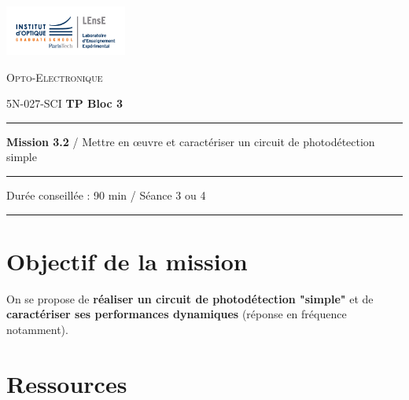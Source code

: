 \newpage
\pagestyle{empty}

\begin{minipage}[c]{.25\linewidth}
	\includegraphics[width=4cm]{images/Logo-LEnsE.png}
\end{minipage} \hfill
\begin{minipage}[c]{.4\linewidth}

\begin{center}
\vspace{0.3cm}
{\Large \textsc{Opto-Electronique}}

\medskip

5N-027-SCI \qquad \textbf{\Large TP Bloc 3}

\end{center}
\end{minipage}\hfill

\vspace{0.5cm}

\noindent \rule{\linewidth}{1pt}

{\noindent\Large \textbf{Mission 3.2} / Mettre en \oe{}uvre et caractériser un circuit de photodétection simple} 

\vspace{-0.5cm}

\begin{center}
\noindent \rule{\linewidth}{1pt}

Durée conseillée : 90 min / Séance 3 ou 4

\vspace{-0.2cm}
\noindent \rule{\linewidth}{1pt}
\end{center}

\section{Objectif de la mission}
\label{mission32}

On se propose de \textbf{réaliser un circuit de photodétection "simple"} et de \textbf{caractériser ses performances dynamiques} (réponse en fréquence notamment).

\section{Ressources}

